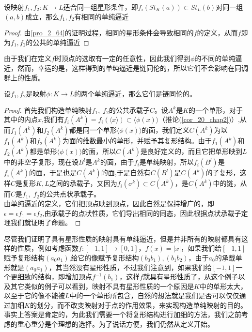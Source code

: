 \begin{corollary}\label{cor_2_79}
设映射$f_{1},f_{2}:K\rightarrow L$适合同一组星形条件，即$f_{i}(St_{K}(a))\subset St_{L}(b)$对同一组$(a,b)$成立，那么$f_{1},f_{2}$有相同的单纯逼近
\end{corollary}
\begin{proof}
由\eqref{pro_2_64}的证明过程，相同的星形条件会导致相同的$f$的定义，从而$f$即为$f_{1},f_{2}$的公共的单纯逼近
\end{proof}
由于我们在定义$f$时顶点的选取有一定的任意性，因此我们得到$\phi$的不同的单纯逼近，然而，幸运的是，这样得到的单纯逼近是链同伦的，所以它们不会影响在同调群上的性质。
\begin{proposition}\label{pro_2_80}
设$f_{1},f_{2}$是映射$\phi:K\rightarrow L$的两个单纯逼近，那么它们是链同伦的。
\end{proposition}
\begin{proof}
首先我们构造单纯映射$f_{1},\;f_{2}$的公共承载子$C$。设$A^{k}$是$K$的一个单形，对于其中的内点$x$,我们有$f_{i}(A^{k})=f_{i}(\langle x\rangle)\subset \langle \phi(x)\rangle$（推论(\ref{cor_20_chap2})）,从而$f_{1}(A^{k})$和$f_{2}(A^{k})$都是同一个单形$\langle \phi(x)\rangle$的面，我们定义$C(A^{k})$为以$f_{1}(A^{k})$和$f_{2}(A^{k})$为面的维数最小的单形，并赋予其复形结构。由于$f_{1}(A^{k})$和$f_{2}(A^{k})$都是单形$\langle \phi(x)\rangle$的面，所以$C(A^{k})$是良好定义的，而且它把单形映到$L$中的非空子复形，现在设$B^{l}$是$A^{k}$的面，由于$f_{i}$是单纯映射，所以$f_{i}(B^{l})$是$f_{i}(A^{k})$的面，于是也是$C(A^{k})$的面,于是自然有$C(B^{l})$是$C(A^{k})$的子复形，这样$C$是复形$K,L$之间的承载子，又因为$f_{i}(\sigma^{k})\subset C(A^{k})$，是$C(A^{k})$中的链，从而$C$是$f_{1},\;f_{2}$的公共点状承载子。\\
由单纯逼近的定义，它们把顶点映到顶点，因此自然是保持增广的，即$\epsilon=\epsilon f_{1}=\epsilon f_{2}$,由承载子的点状性质，它们导出相同的同态，因此根据点状承载子定理我们就证明了命题。
\end{proof}
尽管我们证明了具有星形性质的映射具有单纯逼近，但是并非所有的映射都具有这样的性质，例如考虑函数$f:[-1,1]\rightarrow [0,1]$，$f(x)=|x|$，如果我们给$[-1,1]$赋予复形结构$(a_{0}a_{1})$,给它的像赋予复形结构$(b_{0}b_{1}),(b_{1}b_{2})$，由于$a_{0}$的承载单形就是$(a_{0}a_{1})$，其当然没有星形性质，不过我们注意到，如果我们给$[-1,1]$一个更细致的结构，即增加顶点$f^{-1}(b_{1})$，这样$f$就具有星形性质了，从这个例子以及其它类似的例子可以看到，映射不具有星形性质的一个原因是$K$中的单形太大，以至于它的像不能被$L$中的一个单形所包含，自然的想法就是我们是否可以仅仅通过加细$K$的划分，而不改变映射对于点的作用效果，来实现构造单纯映射的目的。事实上答案是肯定的，为此我们需要一个将复形结构进行加细的方法，我们之前考虑的重心重分是个理想的选择。为了说话方便，我们仍然从定义开始。
